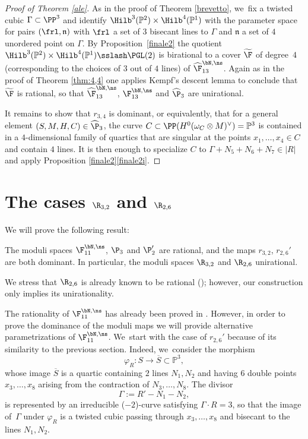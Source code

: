 \begin{proof}[Proof of Theorem \ref{ale}]
As in the proof of Theorem \ref{brevetto}, we~fix a twisted cubic $\Gamma\subset \PP^3$ and identify $ \Hilb^3(\mathbb P^2)\times \Hilb^4(\mathbb P^1)$ with the parameter space for pairs $(\frl,\mathfrak n)$ with $\frl$ a set of $3$ bisecant lines to $\Gamma$ and $\mathfrak n$ a set of $4$ unordered point on $\Gamma$. By Proposition~\ref{finale2} the quotient $\Hilb^3(\mathbb P^2)\times \Hilb^4(\mathbb P^1)\sslash\PGL(2)$ is birational to a cover $\widetilde \F$ of degree~$4$ (corresponding to the choices of $3$ out of $4$ lines) of $\widehat\F_{13}^{\bN,\ns}$. Again as in the proof of Theorem \ref{thm:4,4} one applies Kempf's descent lemma to conclude that $\widetilde \F$ is rational, so that $\widehat\F_{13}^{\bN,\ns}$, $\F_{13}^{\bN,\ns}$ and $\widehat\P_{3}$ are unirational.

It remains to show that $r_{3,4}$ is dominant, or equivalently, that for a general element \linebreak $(S,M,H,C)\in\widehat\P_{3}$, the curve $C\subset \PP(H^0(\omega_C\otimes M)^\vee)=\mathbb P^3$ is contained in a $4$\nobreakdash-dimensional family of quartics that are singular at the points $x_1,\ldots,x_4\in C$ and contain $4$ lines. It is then enough to specialize $C$ to $\Gamma+N_5+N_6+ N_7\in |R|$ and apply Proposition \ref{finale2}\eqref{finale2i}.
\end{proof}

\section{The cases \texorpdfstring{$\R_{3,2}$ and $\R_{2,6}$}{R}}

We will prove the following result:

\begin{thm}\label{enri}
The moduli spaces $\F_{11}^{\bN,\ns}$, $\P_{3}$ and $\P'_{2}$ are rational, and the maps $r_{3,2}$, $r_{2,6}'$ are both dominant. In particular, the moduli spaces $\R_{3,2}$ and $\R_{2,6}$ unirational.
\end{thm}

We stress that $\R_{2,6}$ is already known to be rational (\cf \cite{NOV}); however, our construction only implies its unirationality. 

The rationality of $\F_{11}^{\bN,\ns}$ has already been proved in \cite[Th.\,1.2]{KLV2}. However, in order to prove the dominance of the moduli maps we will provide alternative parametrizations of $\F_{11}^{\bN,\ns}$. We~start with the case of $r_{2,6}'$ because of its similarity to the previous section. Indeed, we~consider the morphism
\[
\varphi_{R}:S\to \overline{S}\subset \mathbb P^3,
\]
whose image $\overline{S}$ is a quartic containing $2$ lines $N_1,N_2$ and having $6$ double points $x_3,\ldots,x_8$ arising from the contraction of $N_3,\ldots,N_8$. The divisor
\[
\Gamma:=R'-N_1-N_2,
\]
is represented by an irreducible ($-2$)-curve satisfying $\Gamma\cdot R=3$, so that the image of~$\Gamma$ under $\varphi_{R}$ is a twisted cubic passing through $x_3,\ldots,x_8$ and bisecant to the lines $N_1,N_2$.

